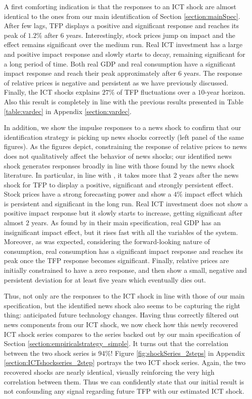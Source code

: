 \documentclass[12pt]{article}
\begin{document}
A first comforting indication is that the responses to an ICT shock are almost identical to the ones from our main identification of Section \ref{section:mainSpec}. After few lags, TFP displays a positive and significant response and reaches its peak of $1.2$\% after $6$ years. Interestingly, stock prices jump on impact and the effect remains significant over the medium run. Real ICT investment has a large and positive impact response and slowly starts to decay, remaining significant for a long period of time. Both real GDP and real consumption have a significant impact response and reach their peak approximately after $6$ years. The response of relative prices is negative and persistent as we have previously discussed. Finally, the ICT shocks explains $27$\% of TFP fluctuations over a $10$-year horizon. Also this result is completely in line with the previous results presented in Table \ref{table:vardec} in Appendix \ref{section:vardec}.

In addition, we show the impulse responses to a news shock to confirm that our identification strategy is picking up news shocks correctly (left panel of the same figures). As the figures depict, constraining the response of relative prices to news does not qualitatively affect the behavior of news shocks; our identified news shock generates responses broadly in line with those found by the news shock literature. In particular, in line with \cite{barsky2011news}, it takes more that 2 years after the news shock for TFP to display a positive, significant and strongly persistent effect. Stock prices have a strong forecasting power and show a $4$\% impact effect which is persistent and significant in the long run. Real ICT investment does not show a positive impact response but it slowly starts to increase, getting significant after almost $2$ years. As found by \cite{barsky2011news} in their main specification, real GDP has an insignificant impact effect, but it rises fast with all the variables of the system. Moreover, as was expected, considering the forward-looking nature of consumption, real consumption has a significant impact response and reaches its peak once the TFP response becomes significant. Finally, relative prices are initially constrained to have a zero response, and then show a small, negative and persistent deviation for at least five years which eventually dies out.

Thus, not only are the responses to the ICT shock in line with those of our main specification, but the identified news shock also seems to be capturing the right thing: anticipated future technology changes. Having thus correctly filtered out news components from our ICT shock, we now check how this newly recovered ICT shock series compares to the series backed out by our main specification of Section \ref{section:empiricalstrategy_simple}. It turns out that the correlation between the two shock series is 94\%! Figure \ref{fig:shockSeries_2steps} in Appendix \ref{section:ICTshockseries_2step} portrays the two ICT shock series. Again, the two recovered shocks are nearly identical, visually reinforcing the very high correlation between them. Thus we can confidently state that our initial result is not confounding any signal regarding future TFP with our estimated ICT shock. 
\end{document}
